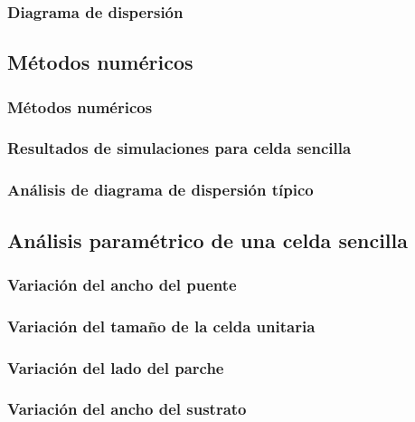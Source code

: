 \documentclass{beamer}
\begin{document}
	 	\begin{frame} %
	 	\frametitle{Diagrama de dispersión}
 	    \end{frame}
      
     \subsection{Métodos numéricos}
	    \begin{frame} %
	    \frametitle{Métodos numéricos}
	 	\end{frame}
	
		\begin{frame} %
		\frametitle{Resultados de simulaciones para celda sencilla}
		\end{frame}
		
		\begin{frame} %
		\frametitle{Análisis de diagrama de dispersión típico}
		\end{frame}
		
	 \subsection{Análisis paramétrico de una celda sencilla}
	 
	 	\begin{frame} %
	 	\frametitle{Variación del ancho del puente}
 		\end{frame}
 	
	 	\begin{frame} %
	 	\frametitle{Variación del tamaño de la celda unitaria}
	 	\end{frame}
 	
	 	\begin{frame} %
	 	\frametitle{Variación del lado del parche}
	 	\end{frame}
 	
	 	\begin{frame} %
	 	\frametitle{Variación del ancho del sustrato}
	 	\end{frame}
 	
\end{document}
